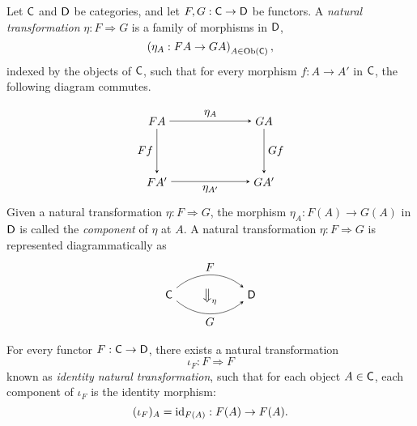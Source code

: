 \begin{definition}
  Let $\mathsf{C}$ and $\mathsf{D}$ be categories, and let $F, G : \mathsf{C} \to \mathsf{D}$ be functors. A \emph{natural transformation} $\eta : F \Rightarrow G$ is a family of morphisms in $\mathsf{D}$,
\[
\left( \eta_A : FA \to GA \right)_{A \in \mathrm{Ob}(\mathsf{C})},
\]
indexed by the objects of $\mathsf{C}$, such that for every morphism $f : A \to A'$ in $\mathsf{C}$, the following diagram commutes. 

\[
\begin{tikzpicture}
  \matrix (m) [matrix of math nodes,row sep=4em,column sep=7em,minimum width=2em]
  {
   FA  & GA  \\
    FA'  & GA'  \\
  };
  \path[-stealth]
    (m-1-1) edge  node [above] {$\eta_A$} (m-1-2)
    (m-2-1) edge  node [below] {$\eta_{A'}$} (m-2-2)
    (m-1-1) edge  node [left] {$Ff$} (m-2-1)
    (m-1-2) edge  node [right] {$Gf$} (m-2-2)
    ;
\end{tikzpicture}
\]
Given a natural transformation \(\eta : F \Rightarrow G\), the morphism \(\eta_A : F(A) \to G(A)\) in \(\mathsf{D}\) is called the \emph{component} of \(\eta\) at \(A\).
A natural transformation $\eta : F \Rightarrow G$ is represented diagrammatically as 
\[
\begin{tikzpicture}
  \matrix (m) [matrix of math nodes,row sep=0.4em,column sep=2em,minimum width=1em]
  {
   \catC   & \big\Downarrow_{\eta} & \catD \\
  };
  \path[-stealth]
    (m-1-1) edge [bend left=40] node [above] {$F$} (m-1-3)
    (m-1-1) edge [bend left=-40] node [below] {$G$} (m-1-3)
    ;
\end{tikzpicture}
\]

\end{definition}


\begin{example}
  For every functor $F : \mathsf{C} \to \mathsf{D}$, there exists a natural transformation
  \[
    \iota_F : F \Rightarrow F
  \]
  known as  \emph{identity natural transformation},  such that for each object $A \in \mathsf{C}$, each component of $\iota_F$ is the identity morphism:
  \[
    (\iota_F)_A = \mathrm{id}_{F(A)} : F(A) \to F(A).
    \] 
\end{example}

